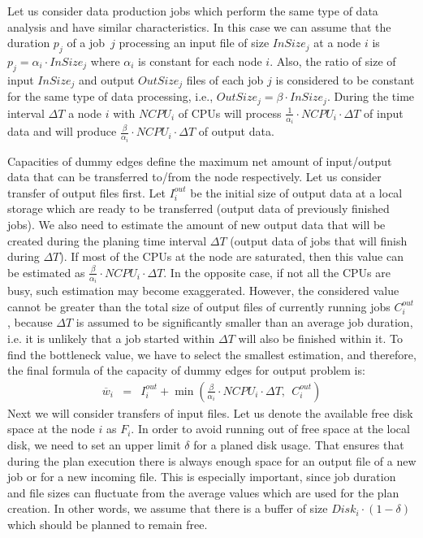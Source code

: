 \documentclass{svjour3}                     %
\begin{document}
Let us consider data production jobs which perform the same type of data analysis and have similar characteristics. In this case we can assume that the duration $p_{j}$ of a job~$j$  processing an input
file of size $InSize_{j}$ at a node $i$ is $p_{j} = \alpha_{i} \cdot
InSize_{j}$ where $\alpha_{i}$ is constant for each node $i$.  Also, the ratio of
size of input $InSize_{j}$ and output $OutSize_{j}$ files of each job $j$ is
considered to be constant for the same type of data processing, i.e.,
$OutSize_{j} = \beta \cdot InSize_{j}$.  During the time interval $\Delta T$ a
node $i$ with $NCPU_{i}$  of CPUs  will process $\frac{1}{\alpha_{i}} \cdot
NCPU_{i} \cdot \Delta T$ of input data and will produce
$\frac{\beta}{\alpha_{i}} \cdot NCPU_{i} \cdot \Delta T$ of output data.

Capacities of dummy edges define the maximum net amount of input/output data that can be transferred to/from the node respectively. Let us consider transfer of output files first. Let $I_{i}^{out}$ be the initial size of output data at a local storage which are ready to be transferred (output data of previously finished jobs). We also need to estimate the amount of new output data that will be created during the planing time interval $\Delta T$ (output data of jobs that will finish during $\Delta T$). If most of the CPUs at the node are saturated, then this value can be estimated as $\frac{\beta}{\alpha_{i}} \cdot NCPU_{i} \cdot \Delta T$. In the opposite case, if not all the CPUs are busy, such estimation may become exaggerated. However, the considered value cannot be greater than the total size of output files of currently running jobs $C_{i}^{out}$, because $\Delta T$ is assumed to be significantly smaller than an average job duration, i.e. it is unlikely that a job started within $\Delta T$ will also be finished within it. To find the bottleneck value, we have to select the smallest estimation, and therefore, the final formula of the capacity of dummy edges for output problem is:
\begin{eqnarray}
\overline{w}_{i} &=& I_{i}^{out} + \min(\frac{\beta}{\alpha_{i}} \cdot NCPU_{i} \cdot \Delta T,\ \  C_{i}^{out}) \label{sigma}
\end{eqnarray}  
Next we will consider transfers of input files. Let us denote the available free disk space at the node $i$ as $F_{i}$. In order to avoid running out of free space at the local disk, we need to set an upper limit $\delta$ for a planed disk usage. That ensures that during the plan execution there is always enough space for an output file of a new job or for a new incoming file. This is especially important, since job duration and file sizes can fluctuate from the average values which are used for the plan creation. In other words, we assume that there is a buffer of size $Disk_{i} \cdot (1 - \delta)$ which should be planned to remain free.
\end{document}
